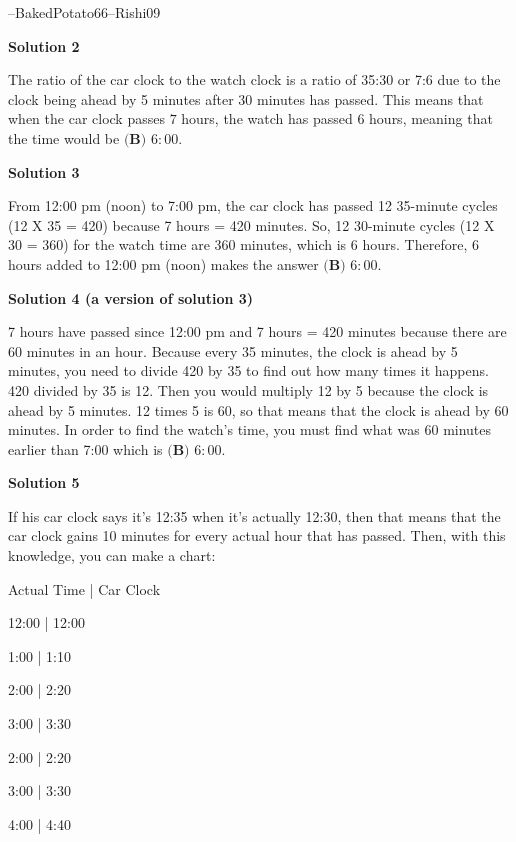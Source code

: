 \begin{enumerate}
 --BakedPotato66--Rishi09

 



\textbf{Solution 2}

The ratio of the car clock to the watch clock is a ratio of 35:30 or 7:6 due to the clock being ahead by 5 minutes after 30 minutes has passed. This means that when the car clock passes $7$ hours, the watch has passed $6$ hours, meaning that the time would be $\boxed{\textbf{(B) }6:00}$. 

 



\textbf{Solution 3}

From 12:00 pm (noon) to 7:00 pm, the car clock has passed 12 35-minute cycles (12 X 35 = 420) because 7 hours = 420 minutes. So, 12 30-minute cycles (12 X 30 = 360) for the watch time are 360 minutes, which is 6 hours. Therefore, 6 hours added to 12:00 pm (noon) makes the answer $\boxed{\textbf{(B) }6:00}$.

 



\textbf{Solution 4 (a version of solution 3)}

7 hours have passed since 12:00 pm and 7 hours = 420 minutes because there are 60 minutes in an hour. Because every 35 minutes, the clock is ahead by 5 minutes, you need to divide 420 by 35 to find out how many times it happens. 420 divided by 35 is 12. Then you would multiply 12 by 5 because the clock is ahead by 5 minutes. 12 times 5 is 60, so that means that the clock is ahead by 60 minutes. In order to find the watch's time, you must find what was 60 minutes earlier than 7:00 which is $\boxed{\textbf{(B) }6:00}$.

 



\textbf{Solution 5}

If his car clock says it's 12:35 when it's actually 12:30, then that means that the car clock gains 10 minutes for every actual hour that has passed. Then, with this knowledge, you can make a chart:

 Actual Time | Car Clock

 12:00       | 12:00

 1:00        | 1:10

 2:00        | 2:20

 3:00        | 3:30

 2:00        | 2:20

 3:00        | 3:30

 4:00        | 4:40


\end{enumerate}
